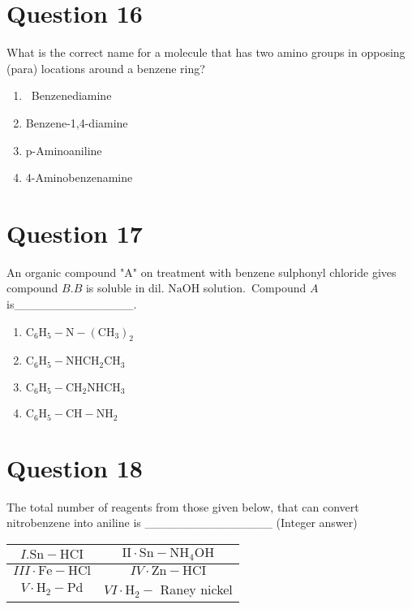 \documentclass{article}
\begin{document}
\section*{Question 16}
What is the correct name for a molecule that has two amino groups in opposing (para) locations around a benzene ring?
\begin{enumerate}[label=(\alph*)]
\item  Benzenediamine
\item Benzene-1,4-diamine
\item p-Aminoaniline
\item 4-Aminobenzenamine
\end{enumerate}
\newpage
\section*{Question 17}
An organic compound "A" on treatment with benzene sulphonyl chloride gives compound \(B . B\) is soluble in dil. \(\mathrm{NaOH}\) solution. Compound \(A\) is______________. 
\begin{enumerate}[label=(\alph*)]
\item \(\mathrm{C}_6 \mathrm{H}_5-\mathrm{N}-\left(\mathrm{CH}_3\right)_2\)
\item \(\mathrm{C}_6 \mathrm{H}_5-\mathrm{NHCH}_2 \mathrm{CH}_3\)
\item \(\mathrm{C}_6 \mathrm{H}_5-\mathrm{CH}_2 \mathrm{NHCH}_3\)
\item \(\mathrm{C}_6 \mathrm{H}_5-\mathrm{CH}-\mathrm{NH}_2\)
\end{enumerate}
\newpage
\section*{Question 18}
The total number of reagents from those given below, that can convert nitrobenzene into aniline is _______________ (Integer answer)\setlength{\arrayrulewidth}{0.8mm}
\begin{tabular}{|c|c|}
\hline
\(I . \mathrm{Sn}-\mathrm{HCI}\) & \(\mathrm{II} \cdot \mathrm{Sn}-\mathrm{NH}_4 \mathrm{OH}\) \\
\hline
\(I I I \cdot \mathrm{Fe}-\mathrm{HCl}\) & \(I V \cdot \mathrm{Zn}-\mathrm{HCI}\) \\
\hline
\(V \cdot \mathrm{H}_2-\mathrm{Pd}\) & \(V I \cdot \mathrm{H}_2-\) Raney nickel \\
\hline
\end{tabular}
\setlength{\arrayrulewidth}{0.4mm}

\begin{enumerate}[label=(\alph*)]
\end{enumerate}
\newpage
\end{document}
